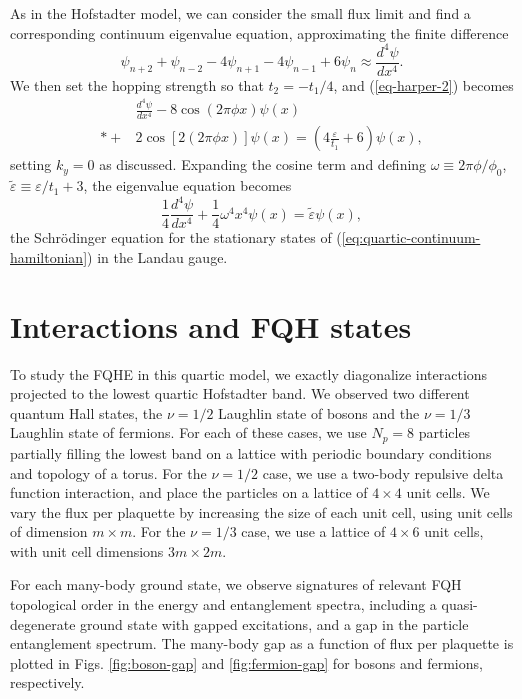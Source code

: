\documentclass[aps,twocolumn,letterpaper,twoside,nobalancelastpage,groupedaddress,amsmath,amssymb,floatfix,citeautoscript]{revtex4-1}
\begin{document}
As in the Hofstadter model, we can consider the small flux limit and find a corresponding continuum eigenvalue equation, approximating the finite difference
\[
\psi_{n+2} + \psi_{n-2} -4 \psi_{n+1} -4 \psi_{n-1} +6\psi_n \approx \frac{d^4\psi}{d x^4}.
\]
We then set the hopping strength so that $t_2 = -t_1/4$, and (\ref{eq-harper-2}) becomes
\begin{align}
&\frac{d^4\psi}{dx^4} - 8\cos(2 \pi \phi x) \psi(x)\nonumber \\*
 + &2\cos\left[2\left(2 \pi \phi x\right)\right]\psi(x) = \left(4\frac{\varepsilon}{t_1}+6\right) \psi(x),
\end{align}
setting $k_y=0$ as discussed. Expanding the cosine term and defining $\omega \equiv 2\pi\phi/\phi_0$, $\tilde{\varepsilon} \equiv \varepsilon/t_1 + 3$, the eigenvalue equation becomes
\[
\frac{1}{4}\frac{d^4\psi}{dx^4} + \frac{1}{4}\omega^4 x^4 \psi(x) = \tilde{\varepsilon} \psi(x),
\]
the Schr{\"o}dinger equation for the stationary states of (\ref{eq:quartic-continuum-hamiltonian}) in the Landau gauge.


\section{Interactions and FQH states}
To study the FQHE in this quartic model, we exactly diagonalize interactions projected to the lowest quartic Hofstadter band. We observed two different quantum Hall states, the $\nu = 1/2$ Laughlin state of bosons and the $\nu = 1/3$ Laughlin state of fermions. For each of these cases, we use $N_p = 8$ particles partially filling the lowest band on a lattice with periodic boundary conditions and topology of a torus. For the $\nu = 1/2$ case, we use a two-body repulsive delta function interaction, and place the particles on a lattice of $4 \times 4$ unit cells. We vary the flux per plaquette by increasing the size of each unit cell, using unit cells of dimension $m \times m$. For the $\nu = 1/3$ case, we use a lattice of $4 \times 6$ unit cells, with unit cell dimensions $3m \times 2m$.

For each many-body ground state, we observe signatures of relevant FQH topological order in the energy and entanglement spectra, including a quasi-degenerate ground state with gapped excitations, and a gap in the particle entanglement spectrum. The many-body gap as a function of flux per plaquette is plotted in Figs. \ref{fig:boson-gap} and \ref{fig:fermion-gap} for bosons and fermions, respectively.

\end{document}
